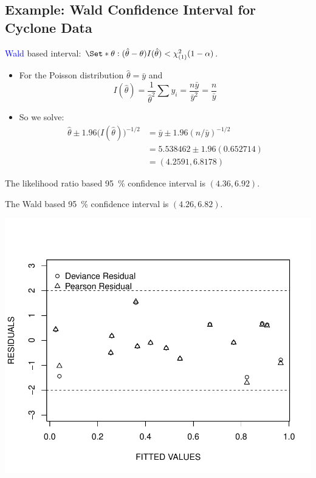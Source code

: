 \documentclass[oneside]{book}\usepackage[]{graphicx}\usepackage[svgnames]{xcolor}
\makeatletter
\def\maxwidth{ %
  \ifdim\Gin@nat@width>\linewidth
    \linewidth
  \else
    \Gin@nat@width
  \fi
}
\newenvironment{knitrout}{}{} %
\providecommand\given{} %
\renewcommand\given{\nonscript\:\delimsize\vert\nonscript\:\mathopen{}}%
\renewcommand\given{\nonscript\:\delimsize\vert\nonscript\:\mathopen{}}%
\renewcommand\given{\nonscript\:\delimsize\vert\nonscript\:\mathopen{}}%
\renewcommand\given{\nonscript\:\delimsize\vert\nonscript\:\mathopen{}}%
\renewcommand\given{\nonscript\:\delimsize\vert\nonscript\:\mathopen{}}%
\renewcommand\given{\nonscript\:\delimsize\vert\nonscript\:\mathopen{}}%
\renewcommand\given{\nonscript\:\delimsize\vert\nonscript\:\mathopen{}}%
\renewcommand\given{\nonscript\:\delimsize\vert\nonscript\:\mathopen{}}%
\renewcommand\given{\nonscript\:\delimsize\vert\nonscript\:\mathopen{}}%
\renewcommand\given{\nonscript\:\delimsize\vert\nonscript\:\mathopen{}}%
\renewcommand\given{\nonscript\:\delimsize\vert\nonscript\:\mathopen{}}%
\renewcommand\given{\nonscript\:\delimsize\vert\nonscript\:\mathopen{}}%
\renewcommand\given{:}
\makeatother
\begin{document}
\subsection*{Example: Wald Confidence Interval for Cyclone Data}
\textcolor{Blue}{Wald} based interval: $ \Set*{\theta\given (\hat{\theta}-\theta)I(\hat{\theta})<\chi^2_{(1)}(1-\alpha)} $.
\begin{itemize}
      \item For the Poisson distribution $ \hat{\theta}=\bar{y} $ and
            \[ I(\hat{\theta})=\frac{1}{\hat{\theta}^2}\sum y_i=\frac{n\bar{y}}{\bar{y}^2} =\frac{n}{\bar{y}} \]
      \item So we solve:
            \begin{align*}
                  \hat{\theta}\pm 1.96\bigl(I(\hat{\theta})\bigr)^{-1/2}
                   & =\bar{y}\pm 1.96(n/\bar{y})^{-1/2} \\
                   & = 5.538462\pm 1.96(0.652714)       \\
                   & = (4.2591, 6.8178)
            \end{align*}
\end{itemize}
The likelihood ratio based \qty{95}{\percent} confidence interval is $(4.36, 6.92)$.

The Wald based \qty{95}{\percent} confidence interval is $(4.26, 6.82)$.
\begin{knitrout}
\color{fgcolor}

{\centering \includegraphics[width=\maxwidth]{figure/unnamed-chunk-34-1} 

}


\end{knitrout}
\end{document}
